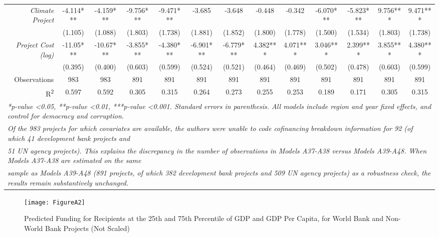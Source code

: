 \documentclass{article}
\begin{document}
\begin{singlespace}
\begin{landscape}
\begin{table}[H]
{\begin{tabular}{rcccccccccccc}
				\textit{Climate Project} & -4.114*** & -4.159*** & -9.756*** & -9.471*** & -3.685 & -3.648 & -0.448 & -0.342 & -6.070*** & -5.823*** & 9.756*** & 9.471*** \\
				\textit{} & (1.105) & (1.088) & (1.803) & (1.738) & (1.881) & (1.852) & (1.800) & (1.778) & (1.500) & (1.534) & (1.803) & (1.738) \\
				\textit{Project Cost (log)} & -11.05*** & -10.67*** & -3.855*** & -4.380*** & -6.901*** & -6.779*** & 4.382*** & 4.071*** & 3.046*** & 2.399*** & 3.855*** & 4.380*** \\
				\textit{} & (0.395) & (0.400) & (0.603) & (0.599) & (0.524) & (0.521) & (0.464) & (0.469) & (0.502) & (0.478) & (0.603) & (0.599) \\ \hline
				Observations & 983 & 983 & 891 & 891 & 891 & 891 & 891 & 891 & 891 & 891 & 891 & 891 \\
				R\textsuperscript{2} & 0.597 & 0.592 & 0.305 & 0.315 & 0.264 & 0.273 & 0.255 & 0.253 & 0.189 & 0.171 & 0.305 & 0.315 \\ \hline
				\multicolumn{13}{l}{\textit{*p-value \textless 0.05, **p-value \textless 0.01, ***p-value \textless 0.001.  Standard errors in parenthesis. All models include region and year fixed effects, and control for democracy and corruption.}} \\
				\multicolumn{13}{l}{\textit{Of the 983 projects for which covariates are available, the authors were unable to code cofinancing breakdown information for 92 (of which 41 development bank projects and}} \\
				\multicolumn{13}{l}{\textit{51 UN agency projects). This explains the discrepancy in the number of observations in Models A37-A38 versus Models A39-A48. When Models A37-A38 are estimated on the same}} \\
				\multicolumn{13}{l}{\textit{sample as Models A39-A48 (891 projects, of which 382 development bank projects and 509 UN agency projects) as a robustness check, the results remain substantively unchanged.}}
			\end{tabular}%
		}
	\end{table}
\end{landscape}


\end{singlespace}

\begin{figure}[H]
	\centering
	\caption{Predicted Funding for Recipients at the 25th and 75th Percentile of GDP and GDP Per Capita, for World Bank and Non-World Bank Projects (Not Scaled)}
	\texttt{[image: FigureA2]}
	\label{fig:figureA2}
\end{figure}
\end{document}
